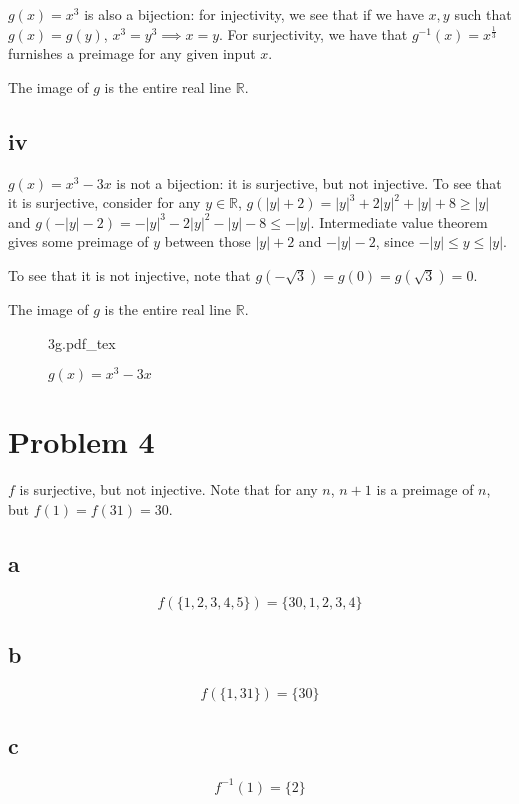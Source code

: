\documentclass[12pt,letterpaper]{article}
\theoremstyle{definition}
\newcommand{\R}{\mathbb{R}}
\newcommand{\incfig}[1] {%
    {#1.pdf_tex}
}
\begin{document}
$g(x) = x^3$ is also a bijection: for injectivity, we see that if we have $x,y$
such that $g(x) = g(y)$, $x^3 = y^3 \implies x = y$. For surjectivity, we have
that $g^{-1}(x) = x^{\frac{1}{3}}$ furnishes a preimage for any given input $x$.
{
The image of $g$ is the entire real line $\R$.

\subsection*{iv}

$g(x) = x^3 - 3x$ is not a bijection: it is surjective, but not injective. To
see that it is surjective, consider for any $y \in \R$, $g(|y| + 2) =
|y|^3 + 2|y|^2 + |y| + 8 \geq |y|$ and $g(-|y|
- 2) = -|y|^3 - 2|y|^2 - |y| - 8 \leq -|y|$. Intermediate value theorem gives
some preimage of $y$ between those $|y| + 2$ and $-|y| - 2$, since $-|y| \leq y \leq |y|$.

To see that it is not injective, note that $g(-\sqrt{3}) = g(0) = g(\sqrt{3}) =
0$.

The image of $g$ is the entire real line $\R$.

\begin{figure}[ht]
  \centering
  \incfig{3g}
  \caption{$g(x) = x^3 - 3x$}
\end{figure}

\section*{Problem 4}

$f$ is surjective, but not injective. Note that for any $n$, $n + 1$ is a
preimage of $n$, but $f(1) = f(31) = 30$.

\subsection*{a}

\[
  f(\{1,2,3,4,5\}) = \{30,1,2,3,4\}
\]

\subsection*{b}

\[
  f(\{1,31\}) = \{30\}
\]

\subsection*{c}

\[
  f^{-1}(1) = \{2\}
\]

}
\end{document}
